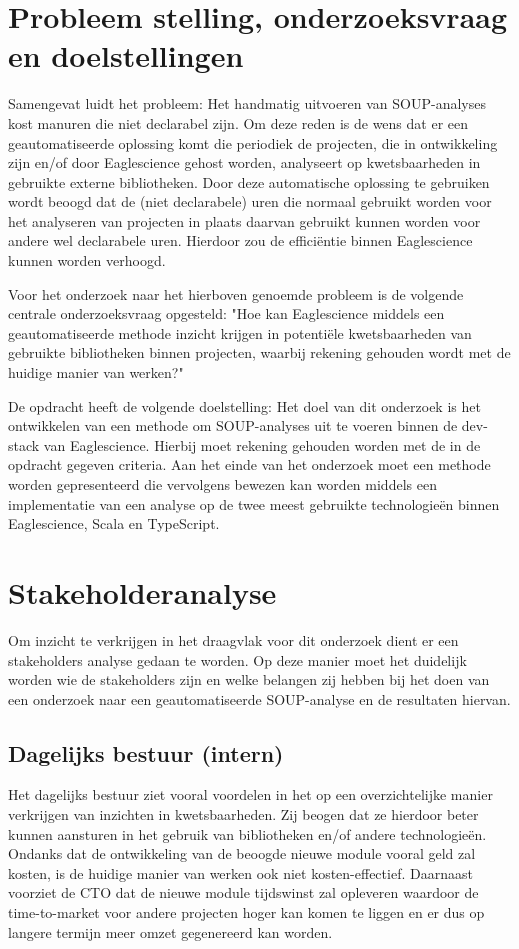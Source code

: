 \section{Probleem stelling, onderzoeksvraag en doelstellingen}\label{sec:probleem-stelling-onderzoeksvraag-en-doelstellingen}
Samengevat luidt het probleem: Het handmatig uitvoeren van SOUP-analyses kost manuren die niet declarabel zijn. Om deze reden is de wens dat er een geautomatiseerde oplossing komt die periodiek de projecten, die in ontwikkeling zijn en/of door Eaglescience gehost worden, analyseert op kwetsbaarheden in gebruikte externe bibliotheken. Door deze automatische oplossing te gebruiken wordt beoogd dat de (niet declarabele) uren die normaal gebruikt worden voor het analyseren van projecten in plaats daarvan gebruikt kunnen worden voor andere wel declarabele uren. Hierdoor zou de efficiëntie binnen Eaglescience kunnen worden verhoogd.

Voor het onderzoek naar het hierboven genoemde probleem is de volgende centrale onderzoeksvraag opgesteld: "Hoe kan Eaglescience middels een geautomatiseerde methode inzicht krijgen in potentiële kwetsbaarheden van gebruikte bibliotheken binnen projecten, waarbij rekening gehouden wordt met de huidige manier van werken?"

De opdracht heeft de volgende doelstelling:
Het doel van dit onderzoek is het ontwikkelen van een methode om SOUP-analyses uit te voeren binnen de dev-stack van Eaglescience. Hierbij moet rekening gehouden worden met de in de opdracht gegeven criteria. Aan het einde van het onderzoek moet een methode worden gepresenteerd die vervolgens bewezen kan worden middels een implementatie van een analyse op de twee meest gebruikte technologieën binnen Eaglescience, Scala en TypeScript.


\section{Stakeholderanalyse}\label{sec:stakeholdersanalyse}
Om inzicht te verkrijgen in het draagvlak voor dit onderzoek dient er een stakeholders analyse gedaan te worden. Op deze manier moet het duidelijk worden wie de stakeholders zijn en welke belangen zij hebben bij het doen van een onderzoek naar een geautomatiseerde SOUP-analyse en de resultaten hiervan.

\subsection{Dagelijks bestuur (intern)}\label{subsec:dagelijks-bestuur-(intern)1}
Het dagelijks bestuur ziet vooral voordelen in het op een overzichtelijke manier verkrijgen van inzichten in kwetsbaarheden. Zij beogen dat ze hierdoor beter kunnen aansturen in het gebruik van bibliotheken en/of andere technologieën. Ondanks dat de ontwikkeling van de beoogde nieuwe module vooral geld zal kosten, is de huidige manier van werken ook niet kosten-effectief. Daarnaast voorziet de CTO dat de nieuwe module tijdswinst zal opleveren waardoor de time-to-market voor andere projecten hoger kan komen te liggen en er dus op langere termijn meer omzet gegenereerd kan worden.

